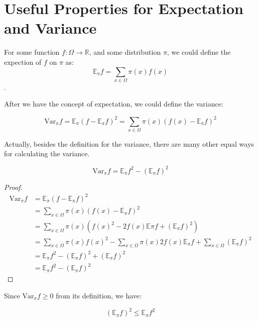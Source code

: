 \section{Useful Properties for Expectation and Variance}
\begin{define}[Expectation]
  For some function $f: \Omega\to \mathbb{R}$, and some distribution $\pi$, we could define the expection of $f$ on $\pi$ as: \[\mathbb{E}_\pi f = \sum_{x\in\Omega} \pi(x)f(x)\].
\end{define}
After we have the concept of expectation, we could define the variance:

\begin{define}[Variance]
  \[\mathrm{Var}_\pi f = \mathbb{E}_\pi (f - \mathbb{E}_\pi f)^2 = \sum_{x\in\Omega}\pi(x)(f(x)-\mathbb{E}_\pi f)^2\]
\end{define}
Actually, besides the definition for the variance, there are many other equal ways for calculating the variance.

\begin{proposition}
  \[\mathrm{Var}_\pi f = \mathbb{E}_\pi f^2 - (\mathbb{E}_\pi f)^2\]
\end{proposition}
\begin{proof}
  \begin{align*}
    \mathrm{Var}_\pi f
    &= \mathbb{E}_\pi (f - \mathbb{E}_\pi f)^2 \\
    &= \sum_{x\in\Omega} \pi(x)(f(x) - \mathbb{E}_\pi f)^2 \\
    &= \sum_{x\in\Omega} \pi(x)(f(x)^2 - 2f(x)\mathbb{E}\pi f + (\mathbb{E}_\pi f)^2) \\
    &= \sum_{x\in\Omega} \pi(x) f(x)^2 - \sum_{x\in\Omega} \pi(x)2f(x)\mathbb{E}_\pi f + \sum_{x\in\Omega} (\mathbb{E}_\pi f)^2 \\
    &= \mathbb{E}_\pi f^2 - (\mathbb{E}_\pi f)^2 + (\mathbb{E}_\pi f)^2 \\
    &= \mathbb{E}_\pi f^2 - (\mathbb{E}_\pi f)^2
  \end{align*}
\end{proof}
Since $\mathrm{Var}_\pi f \geq 0$ from its definition, we have:
\begin{corollary}
  \[(\mathbb{E}_\pi f)^2 \leq \mathbb{E}_\pi f^2\]
\end{corollary}

